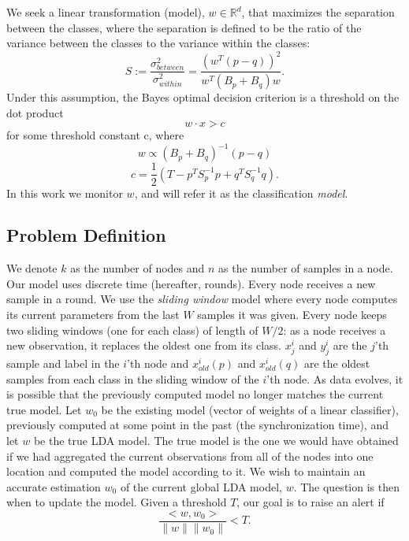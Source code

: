 We seek a linear transformation (model), $w \in \mathbb{R}^d $,
that maximizes the separation between the classes, where the separation is
defined to be the ratio of the variance between the classes to the variance
within the classes:
\begin{equation}
S := \frac{\sigma^2_{between}}{\sigma^2_{within}} = \frac{(w^T (p -
q))^2}{w^T(B_p+B_q)w}.
\end{equation}
Under this assumption, the Bayes optimal decision criterion is a threshold on the
dot product
\begin{equation*} \label{eq:decision}
w \cdot x > c
\end{equation*}
for some threshold constant c, where
\begin{equation} \label{eq:w}
w \propto (B_p+B_q)^{-1}(p - q)
\end{equation}
\begin{equation} \label{eq:c}
c = \frac{1}{2}(T-{p}^T S_p^{-1} {p}+{q}^T S_q^{-1} {q}).
\end{equation}
In this work we monitor $w$, and will refer it as the
classification \textit{model}.

\subsection{Problem Definition}
We denote $k$ as the number of nodes and
$n$ as the number of samples in a node.
Our model uses discrete time (hereafter, rounds). Every node receives a new sample
in a round.
We use the \textit{sliding window} model where every node computes its current
parameters from the last $W$ samples it was given.
Every node keeps two sliding windows (one for each class) of length of $W/2$: 
as a node receives a new observation, it replaces the oldest one from its class.
$x^i_j$ and $y^i_j$ are the $j$'th sample and label in the $i$'th node
and $x_{old}^i(p)$ and $x_{old}^i(q)$ are the oldest samples from each class in
the sliding window of the $i$'th node.
As data evolves, it is possible that the previously computed model
no longer matches the current true model.
Let $w_0$ be the existing model (vector of weights of a linear classifier),
previously computed at some point in the past (the synchronization time),
and let $w$ be the true LDA model.
The true model is the one we would have obtained if we had aggregated the current observations from all of the nodes into one location and computed the model according to it.
We wish to maintain an accurate estimation $w_0$ of the current global LDA model, $w$.
The question is then when to update the model.
Given a threshold $T$, our goal is to raise an alert if
\begin{equation} \label{eq:coneCritiria}
\frac{<w,w_0>}{\parallel w \parallel \parallel w_0 \parallel}  < T.
\end{equation}

